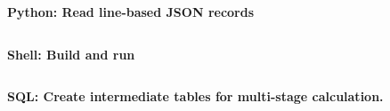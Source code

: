 \documentclass{article}
\newcommand{\heading}[1] {
\bigskip
\textrm{\bfseries #1}
}
\begin{document}

\heading{Python: Read line-based JSON records}
\inputminted{python}{read_json_lines.py}

\heading{Shell: Build and run}
\inputminted{sh}{build_and_run.sh}

\pagebreak

\heading{SQL: Create intermediate tables for multi-stage calculation.}
\inputminted{sql}{create_select.sql}
\end{document}

